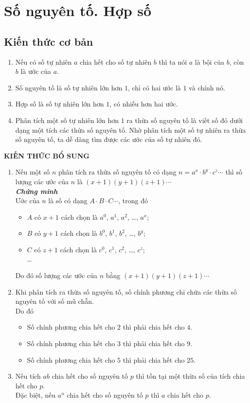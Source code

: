 \section{Số nguyên tố. Hợp số}
\subsection{Kiến thức cơ bản}
\begin{enumerate}
	\item Nếu có số tự nhiên $a$ chia hết cho số tự nhiên $b$ thì ta nói $a$ là bội của $b$, còn $b$ là ước của $a$.
	\item Số nguyên tố là số tự nhiên lớn hơn $1$, chỉ có hai ước là $1$ và chính nó.
	\item Hợp số là số tự nhiên lớn hơn $1$, có nhiều hơn hai ước.
	\item Phân tích một số tự nhiên lớn hơn $1$ ra thừa số nguyên tố là viết số đó dưới dạng một tích các thừa số nguyên tố. Nhờ phân tích một số tự nhiên ra thừa số nguyên tố, ta dễ dàng tìm được các ước của số tự nhiên đó.
\end{enumerate}
\textbf{KIẾN THỨC BỔ SUNG}
\begin{enumerate}
	\item Nếu một số $n$ phân tích ra thừa số nguyên tố có dạng $n=a^x\cdot b^y\cdot c^z\cdots$ thì số lượng các ước của $n$ là $(x+1)(y+1)(z+1)\cdots$\\
	\textbf{\textit{Chứng minh}}\\
	Ước của $n$ là số có dạng $A\cdot B\cdot C\cdots$, trong đó
	\begin{itemize}
		\item $A$ có $x+1$ cách chọn là $a^0$, $a^1$, $a^2$, \ldots, $a^x$;
		\item $B$ có $y+1$ cách chọn là $b^0$, $b^1$, $b^2$, \ldots, $b^y$;
		\item $C$ có $z+1$ cách chọn là $c^0$, $c^1$, $c^2$, \ldots, $c^z$;\\
		\ldots
	\end{itemize}
	Do đó số lượng các ước của $n$ bằng $(x+1)(y+1)(z+1)\cdots$
	\item Khi phân tích ra thừa số nguyên tố, số chính phương chỉ chứa các thừa số nguyên tố với số mũ chẵn.\\
	Do đó
	\begin{itemize}
		\item Số chính phương chia hết cho $2$ thì phải chia hết cho $4$.
		\item Số chính phương chia hết cho $3$ thì phải chia hết cho $9$.
		\item Số chính phương chia hết cho $5$ thì phải chia hết cho $25$.
	\end{itemize}
	\item Nếu tích $ab$ chia hết cho số nguyên tố $p$ thì tồn tại một thừa số của tích chia hết cho $p$.\\
	Đặc biệt, nếu $a^n$ chia hết cho số nguyên tố $p$ thì $a$ chia hết cho $p$.
\end{enumerate}
